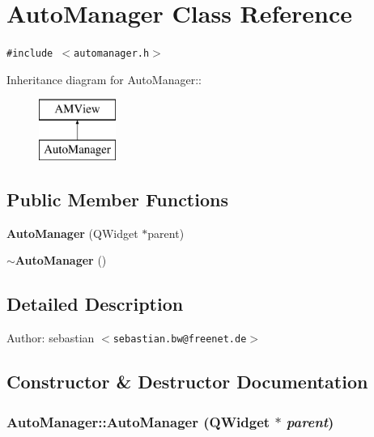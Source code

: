 \section{Auto\-Manager Class Reference}
\label{classAutoManager}
{\tt \#include $<$automanager.h$>$}

Inheritance diagram for Auto\-Manager::\begin{figure}[H]
\begin{center}
\leavevmode
\includegraphics[height=2cm]{classAutoManager}
\end{center}
\end{figure}
\subsection*{Public Member Functions}
\begin{CompactItemize}
\item 
{\bf Auto\-Manager} (QWidget $\ast$parent)
\item 
{\bf $\sim$Auto\-Manager} ()
\end{CompactItemize}


\subsection{Detailed Description}
\begin{Desc}
\item[Author:]sebastian $<${\tt sebastian.bw@freenet.de}$>$ \end{Desc}




\subsection{Constructor \& Destructor Documentation}
\subsubsection{\setlength{\rightskip}{0pt plus 5cm}Auto\-Manager::Auto\-Manager (QWidget $\ast$ {\em parent})}\label{classAutoManager_7d148ced4de66fa2a22c828aee4288d0}


